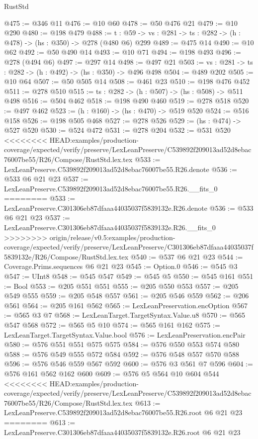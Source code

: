 \begin{lexlean}{RustStd}
\begin{coremodule}
{\begin{coremodule}
@475 := @346 @11
@476 := @10 @60
@478 := @50 @476 @21
@479 := @10 @290
@480 := @198 @479
@488 := {t : @59} -> {vs : @281} -> {ts : @282} -> (h : @478) -> (hs : @350) -> @278 (@480 @6) @299
@489 := @475 @14
@490 := @10 @62
@492 := @50 @490 @14
@493 := @10 @71
@494 := @198 @493
@496 := @278 (@494 @6)
@497 := @297 @14
@498 := @497 @21
@503 := {vs : @281} -> {ts : @282} -> (h : @492) -> (hs : @350) -> @496 @498
@504 := @489 @202
@505 := @10 @64
@507 := @50 @505 @14
@508 := @461 @23
@510 := @198 @476 @452
@511 := @278 @510
@515 := {ts : @282} -> (h : @507) -> (hs : @508) -> @511 @498
@516 := @504 @462
@518 := @198 @490 @460
@519 := @278 @518
@520 := @497 @462
@523 := (h : @160) -> (hs : @470) -> @519 @520
@524 := @516 @158
@526 := @198 @505 @468
@527 := @278 @526
@529 := (hs : @474) -> @527 @520
@530 := @524 @472
@531 := @278 @204
@532 := @531 @520
<<<<<<<< HEAD:examples/production-coverage/expected/verify/preserve/LexLeanPreserve/C539892f209013ad52d8ebac76007be55/R26/Compose/RustStd.lex.tex
@533 := LexLeanPreserve.C539892f209013ad52d8ebac76007be55.R26.denote
@536 := @533 @6 @21 @23
@537 := LexLeanPreserve.C539892f209013ad52d8ebac76007be55.R26.__fits_0
========
@533 := LexLeanPreserve.C301306eb87dfaaa44035037f5839132e.R26.denote
@536 := @533 @6 @21 @23
@537 := LexLeanPreserve.C301306eb87dfaaa44035037f5839132e.R26.__fits_0
>>>>>>>> origin/release/v0.5:examples/production-coverage/expected/verify/preserve/LexLeanPreserve/C301306eb87dfaaa44035037f5839132e/R26/Compose/RustStd.lex.tex
@540 := @537 @6 @21 @23
@544 := Coverage.Prims.sequences @6 @21 @23
@545 := Option.{0}
@546 := @545 @3
@547 := UInt8
@548 := @545 @547
@549 := @545 @5
@550 := @545 @161
@551 := Bool
@553 := @205 @551 @551
@555 := @205 @550 @553
@557 := @205 @549 @555
@559 := @205 @548 @557
@561 := @205 @546 @559
@562 := @206 @561
@564 := @205 @161 @562
@565 := LexLeanPreservation.encOption
@567 := @565 @3 @7
@568 := LexLeanTarget.TargetSyntax.Value.u8
@570 := @565 @547 @568
@572 := @565 @5 @10
@574 := @565 @161 @162
@575 := LexLeanTarget.TargetSyntax.Value.bool
@576 := LexLeanPreservation.encPair
@580 := @576 @551 @551 @575 @575
@584 := @576 @550 @553 @574 @580
@588 := @576 @549 @555 @572 @584
@592 := @576 @548 @557 @570 @588
@596 := @576 @546 @559 @567 @592
@600 := @576 @3 @561 @7 @596
@604 := @576 @161 @562 @162 @600
@609 := @576 @5 @564 @10 @604 @544
<<<<<<<< HEAD:examples/production-coverage/expected/verify/preserve/LexLeanPreserve/C539892f209013ad52d8ebac76007be55/R26/Compose/RustStd.lex.tex
@613 := LexLeanPreserve.C539892f209013ad52d8ebac76007be55.R26.root @6 @21 @23
========
@613 := LexLeanPreserve.C301306eb87dfaaa44035037f5839132e.R26.root @6 @21 @23

\end{coremodule}}
\end{coremodule}
\end{lexlean}
